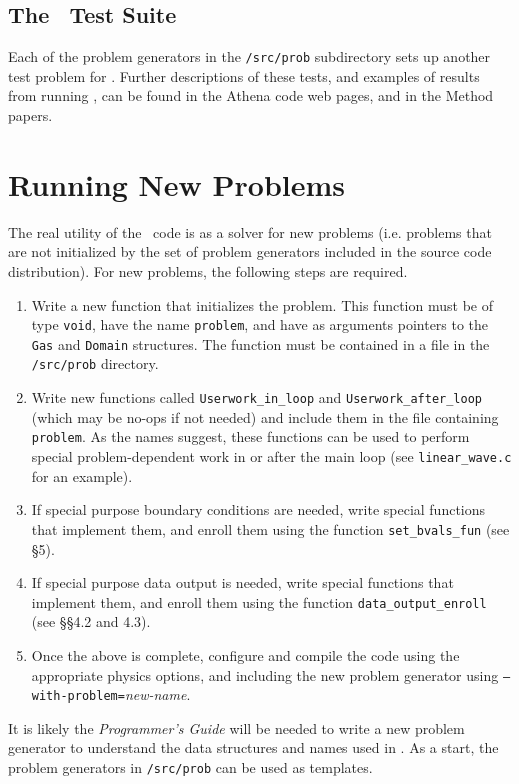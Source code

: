 \subsection{The \ath\ Test Suite}

Each of the problem generators in the {\tt /src/prob} subdirectory sets
up another test problem for \ath.  Further descriptions of these tests, and
examples of results from running \ath, can be found in the Athena code 
web pages, and in the Method papers.
  
\section{Running New Problems}

The real utility of the \ath\ code is as a solver for new problems
(i.e. problems that
are not initialized by the set of problem generators included in the source
code distribution).  For new problems, the following steps are required.
\begin{enumerate}
\item Write a new function that initializes the problem.  This function must
be of type {\tt void}, have the name {\tt problem}, and have as arguments
pointers to the {\tt Gas} and {\tt Domain} structures.
The function must be contained in a file in the {\tt /src/prob} directory.
\item Write new functions called {\tt Userwork\_in\_loop} and 
{\tt Userwork\_after\_loop} (which may be no-ops if not needed) and include
them in the file containing {\tt problem}.  As the names suggest, these
functions can be used to perform special problem-dependent work in or 
after the main loop (see {\tt linear\_wave.c} for an example).
\item If special purpose boundary conditions are needed, write special
functions that implement them, and enroll them using the function
{\tt set\_bvals\_fun} (see \S 5).
\item If special purpose data output is needed, write special
functions that implement them, and enroll them using the function
{\tt data\_output\_enroll} (see \S\S 4.2 and 4.3).
\item Once the above is complete, configure and compile the code
using the appropriate physics options, and including the new problem
generator using {\tt --with-problem=}{\em new-name}.
\end{enumerate}

It is likely the {\em Programmer's Guide} will be needed to write a 
new problem generator to understand the data structures and names used
in \ath.  As a start, the problem generators in {\tt /src/prob} can be used
as templates.


